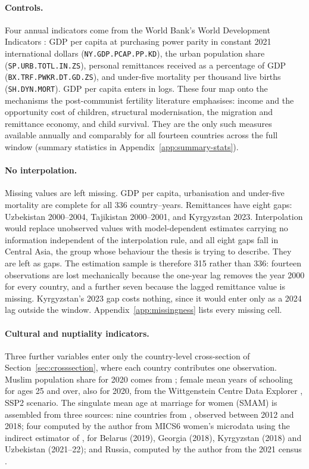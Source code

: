 \paragraph{Controls.} Four annual indicators come from the World Bank's World Development Indicators \parencite{wdi2024}: GDP per capita at purchasing power parity in constant 2021 international dollars (\texttt{NY.GDP.PCAP.PP.KD}), the urban population share (\texttt{SP.URB.TOTL.IN.ZS}), personal remittances received as a percentage of GDP (\texttt{BX.TRF.PWKR.DT.GD.ZS}), and under-five mortality per thousand live births (\texttt{SH.DYN.MORT}). GDP per capita enters in logs. These four map onto the mechanisms the post-communist fertility literature emphasises: income and the opportunity cost of children, structural modernisation, the migration and remittance economy, and child survival. They are the only such measures available annually and comparably for all fourteen countries across the full window (summary statistics in Appendix~\ref{app:summary-stats}).

\paragraph{No interpolation.} Missing values are left missing. GDP per capita, urbanisation and under-five mortality are complete for all 336 country--years. Remittances have eight gaps: Uzbekistan 2000--2004, Tajikistan 2000--2001, and Kyrgyzstan 2023. Interpolation would replace unobserved values with model-dependent estimates carrying no information independent of the interpolation rule, and all eight gaps fall in Central Asia, the group whose behaviour the thesis is trying to describe. They are left as gaps. The estimation sample is therefore 315 rather than 336: fourteen observations are lost mechanically because the one-year lag removes the year 2000 for every country, and a further seven because the lagged remittance value is missing. Kyrgyzstan's 2023 gap costs nothing, since it would enter only as a 2024 lag outside the window. Appendix~\ref{app:missingness} lists every missing cell.

\paragraph{Cultural and nuptiality indicators.} Three further variables enter only the country-level cross-section of Section~\ref{sec:crosssection}, where each country contributes one observation. Muslim population share for 2020 comes from \textcite{pew2025}; female mean years of schooling for ages 25 and over, also for 2020, from the Wittgenstein Centre Data Explorer \parencite{wittgenstein2018}, SSP2 scenario. The singulate mean age at marriage for women (SMAM) is assembled from three sources: nine countries from \textcite{wmd2019}, observed between 2012 and 2018; four computed by the author from MICS6 women's microdata \parencite{mics} using the indirect estimator of \textcite{hajnal1953}, for Belarus (2019), Georgia (2018), Kyrgyzstan (2018) and Uzbekistan (2021--22); and Russia, computed by the author from the 2021 census \parencite{rosstat2021}.

